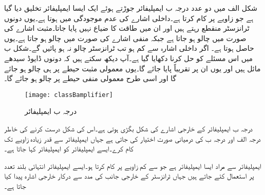 شکل  الف میں دو عدد درجہ ب ایمپلیفائر جوڑتے ہوئے ایک ایسا ایمپلیفائر تخلیق دیا گیا ہے جو  زاویے پر کام کرتا ہے۔داخلی اشارے کی عدم موجودگی میں  ہوتا ہے۔یوں دونوں ٹرانزسٹر منقطع رہتے ہیں اور ان میں طاقت کا ضیاع نہیں پایا جاتا۔مثبت اشارے کی صورت میں  چالو ہو جاتا ہے جبکہ منفی اشارے کی صورت میں  چالو ہو جاتا ہے۔یوں  حاصل ہوتا ہے۔ اگر داخلی اشارہ  سے کم ہو تب ٹرانزسٹر چالو نہ ہو پائیں گے۔شکل ب میں اس مسئلے کو حل کرنا دکھایا گیا ہے۔آپ دیکھ سکتے ہیں کہ دونوں ڈایوڈ سیدھے مائل ہیں اور یوں ان پر تقریباً  پایا جائے گا۔یوں معمولی مثبت حیطے  پر ہی  چالو ہو جائے گا اور اسی طرح معمولی منفی حیطے پر  چالو ہو جائے گا۔

\begin{figure}
\centering
\texttt{[image: classBamplifier]}
\caption{درجہ ب ایمپلیفائر}
\label{شکل_ٹرانزسٹر_درجہ_ب_ایمپلیفائر}
\end{figure}

درجہ ب ایمپلیفائر  کے خارجی اشارے کی شکل بگڑی ہوتی ہے۔اس کی شکل درست کرنے کی خاطر درجہ الف اور درجہ ب کی درمیانی صورت اختیار کی جاتی ہے جہاں ایمپلیفائر  سے قدر زیادہ زاویے تک کام کرے۔ایسے ایمپلیفائر کو 
 ایمپلیفائر کہا جاتا ہے۔

 ایمپلیفائر سے مراد ایسا ایمپلیفائر ہے جو  سے کم زاویے پر کام کرتا ہو۔ایسے  ایمپلیفائر انتہائی بلند تعدد پر استعمال کئے جاتے ہیں جہاں ٹرانزسٹر کے خارجی جانب  کی مدد سے درکار خارجی اشارہ پیدا کیا جاتا ہے۔

